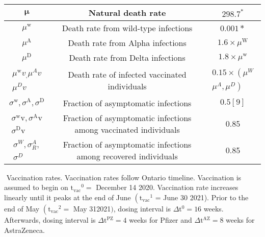 \documentclass[10pt]{article}
\begin{document}
\begin{center}
\begin{tabular}{|c|c|c|}
\hline
$\boldsymbol{\mu}$ & Natural death rate & $298.7^{*}$ \\
\hline
$\mu^{\mathrm{w}}$ & Death rate from wild-type infections & $0.001 *$ \\
\hline
$\mu^{\mathrm{A}}$ & Death rate from Alpha infections & $1.6 \times \mu^{\mathrm{W}}$ \\
\hline
$\mu^{\mathrm{D}}$ & Death rate from Delta infections & $1.8 \times \mu^{\mathrm{w}}$ \\
\hline
$\begin{array}{l}\mu^{\mathrm{w}} v_{,} \mu^{A} v \\ \mu^{D} v\end{array}$ & Death rate of infected vaccinated individuals & $\begin{array}{l}0.15 \times\left(\mu^{W}\right. \\ \left.\mu^{A}, \mu^{D}\right)\end{array}$ \\
\hline
$\sigma^{\mathrm{w}}, \sigma^{\mathrm{A}}, \sigma^{\mathrm{D}}$ & Fraction of asymptomatic infections & $0.5[9]$ \\
\hline
$\begin{array}{l}\sigma^{\mathrm{w}} \mathrm{v}, \sigma^{\mathrm{A}} \mathrm{v} \\ \sigma^{\mathrm{D}} \mathrm{v}\end{array}$ & Fraction of asymptomatic infections among vaccinated individuals & 0.85 \\
\hline
$\begin{array}{l}\sigma^{W}, \sigma_{R}^{A}, \\ \sigma^{D}\end{array}$ & Fraction of asymptomatic infections among recovered individuals & 0.85 \\
\hline
\end{tabular}
\end{center}
​
Vaccination rates. Vaccination rates follow Ontario timeline. Vaccination is assumed to begin on $\mathrm{t}_{\mathrm{vac}}{ }^{0}=$ December 14 2020. Vaccination rate increases linearly until it peaks at the end of June $\left(\mathrm{t}_{\mathrm{vac}}{ }^{1}\right.$ = June 30 2021). Prior to the end of May $\left(\mathrm{t}_{\mathrm{vac}}{ }^{2}=\right.$ May 312021$)$, dosing interval is $\Delta \mathrm{t}^{0}=16$ weeks. Afterwards, dosing interval is $\Delta \mathrm{t}^{\mathrm{PZ}}=4$ weeks for Pfizer and $\Delta \mathrm{t}^{\mathrm{AZ}}=8$ weeks for AstraZeneca.
\end{document}
